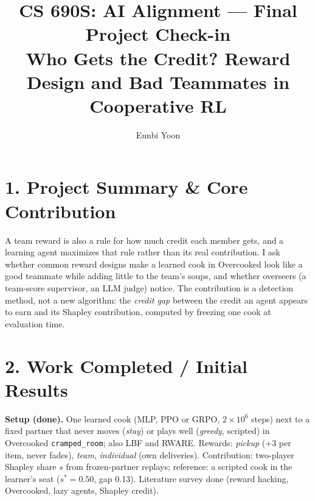 \documentclass[10pt]{article}
\title{\vspace{-3em}CS 690S: AI Alignment --- Final Project Check-in\\
\large Who Gets the Credit? Reward Design and Bad Teammates in Cooperative RL}
\author{Eunbi Yoon}
\date{}
\begin{document}
\sloppy
\maketitle
\vspace{-3em}

\section*{1. Project Summary \& Core Contribution}
A team reward is also a rule for how much credit each member gets, and a learning agent maximizes
that rule rather than its real contribution. I ask whether common reward designs make a learned cook
in Overcooked look like a good teammate while adding little to the team's soups, and whether
overseers (a team-score supervisor, an LLM judge) notice. The contribution is a detection method,
not a new algorithm: the \emph{credit gap} between the credit an agent appears to earn and its
Shapley contribution, computed by freezing one cook at evaluation time.

\section*{2. Work Completed / Initial Results}
\textbf{Setup (done).} One learned cook (MLP, PPO or GRPO, $2\times10^6$ steps) next to a fixed
partner that never moves (\emph{stay}) or plays well (\emph{greedy}, scripted) in Overcooked
\texttt{cramped\_room}; also LBF and RWARE. Rewards: \emph{pickup} (+3 per item, never fades),
\emph{team}, \emph{individual} (own deliveries). Contribution: two-player Shapley share $s$ from
frozen-partner replays; reference: a scripted cook in the learner's seat ($s^*=0.50$, gap 0.13).
Literature survey done (reward hacking, Overcooked, lazy agents, Shapley credit).
\end{document}
